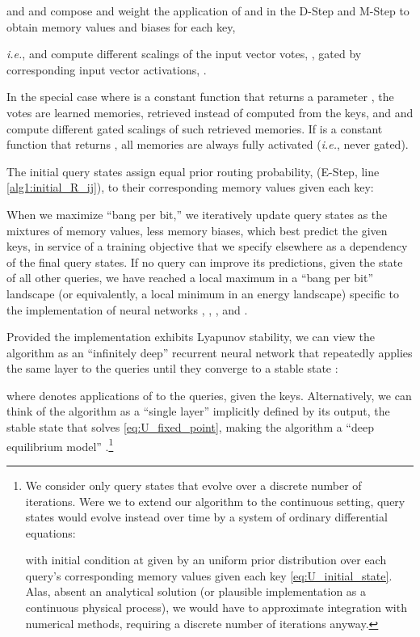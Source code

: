 \documentclass[11pt,a4paper]{article}
\begin{document}
and  and  compose and weight the application of  and  in the D-Step and M-Step to obtain memory values and biases for each key,



{\em i.e.},  and  compute different scalings of the input vector votes, , gated by corresponding input vector activations, .

In the special case where  is a constant function that returns a parameter , the votes are learned memories, retrieved instead of computed from the keys, and  and  compute different gated scalings of such retrieved memories. If  is a constant function that returns , all memories are always fully activated ({\em i.e.}, never gated).

The initial query states assign equal prior routing probability,  (E-Step, line \ref{alg1:initial_R_ij}), to their corresponding memory values given each key:




When we maximize ``bang per bit,'' we iteratively update query states as the mixtures of memory values, less memory biases, which best predict the given keys, in service of a training objective that we specify elsewhere as a dependency of the final query states. If no query can improve its predictions, given the state of all other queries, we have reached a local maximum in a ``bang per bit'' landscape (or equivalently, a local minimum in an energy landscape) specific to the implementation of neural networks , , , and .

Provided the implementation exhibits Lyapunov stability, we can view the algorithm as an ``infinitely deep'' recurrent neural network that repeatedly applies the same layer  to the queries until they converge to a stable state :



where  denotes  applications of  to the queries, given the keys. Alternatively, we can think of the algorithm as a ``single layer'' implicitly defined by its output, the stable state  that solves \eqref{eq:U_fixed_point}, making the algorithm a ``deep equilibrium model'' \cite{DBLP:journals/corr/abs-1909-01377}.\footnote{
	We consider only query states that evolve over a discrete number of iterations. Were we to extend our algorithm to the continuous setting, query states would evolve instead over time  by a system of ordinary differential equations:
	
	with initial condition at  given by an uniform prior distribution over each query's corresponding memory values given each key \eqref{eq:U_initial_state}. Alas, absent an analytical solution (or plausible implementation as a continuous physical process), we would have to approximate integration with numerical methods, requiring a discrete number of iterations anyway.
}
\end{document}
